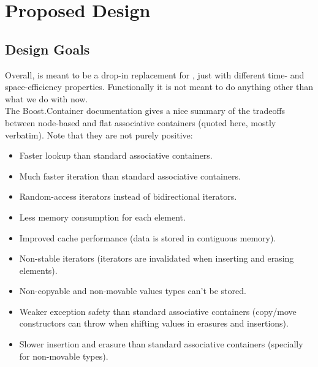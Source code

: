 \section{Proposed Design}

\subsection{Design Goals}

Overall,  is meant to be a drop-in replacement for ,
just with different time- and space-efficiency properties.  Functionally it is
not meant to do anything other than what we do with  now.\\

The Boost.Container documentation gives a nice summary of the tradeoffs
between node-based and flat associative containers (quoted here, mostly
verbatim).  Note that they are not purely positive:

\begin{itemize}
  \item Faster lookup than standard associative containers.

  \item Much faster iteration than standard associative
    containers.

  \item Random-access iterators instead of bidirectional iterators.

  \item Less memory consumption for each element.

  \item Improved cache performance (data is stored in contiguous memory).

  \item Non-stable iterators (iterators are invalidated when inserting and
    erasing elements).

  \item Non-copyable and non-movable values types can't be stored.

  \item Weaker exception safety than standard associative containers
    (copy/move constructors can throw when shifting values in erasures and
    insertions).

  \item Slower insertion and erasure than standard associative containers
    (specially for non-movable types).
\end{itemize}

